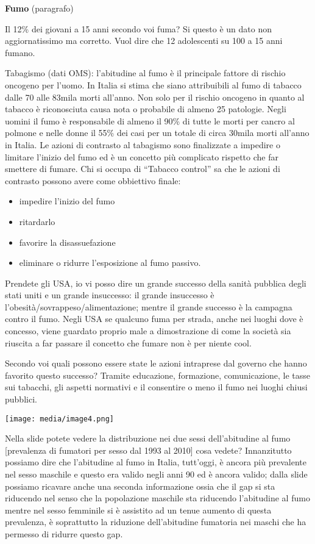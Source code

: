\documentclass[]{article}
\begin{document}
\textbf{Fumo} (paragrafo)

Il 12\% dei giovani a 15 anni secondo voi fuma? Si questo è un dato non
aggiornatissimo ma corretto. Vuol dire che 12 adolescenti su 100 a 15
anni fumano.

Tabagismo (dati OMS): l'abitudine al fumo è il principale fattore di
rischio oncogeno per l'uomo. In Italia si stima che siano attribuibili
al fumo di tabacco dalle 70 alle 83mila morti all'anno. Non solo per il
rischio oncogeno in quanto al tabacco è riconosciuta causa nota o
probabile di almeno 25 patologie. Negli uomini il fumo è responsabile di
almeno il 90\% di tutte le morti per cancro al polmone e nelle donne il
55\% dei casi per un totale di circa 30mila morti all'anno in Italia. Le
azioni di contrasto al tabagismo sono finalizzate a impedire o limitare
l'inizio del fumo ed è un concetto più complicato rispetto che far
smettere di fumare. Chi si occupa di ``Tabacco control'' sa che le
azioni di contrasto possono avere come obbiettivo finale:

\begin{itemize}
\item
  impedire l'inizio del fumo
\item
  ritardarlo
\item
  favorire la disassuefazione
\item
  eliminare o ridurre l'esposizione al fumo passivo.
\end{itemize}

Prendete gli USA, io vi posso dire un grande successo della sanità
pubblica degli stati uniti e un grande insuccesso: il grande insuccesso
è l'obesità/sovrappeso/alimentazione; mentre il grande successo è la
campagna contro il fumo. Negli USA se qualcuno fuma per strada, anche
nei luoghi dove è concesso, viene guardato proprio male a dimostrazione
di come la società sia riuscita a far passare il concetto che fumare non
è per niente cool.

Secondo voi quali possono essere state le azioni intraprese dal governo
che hanno favorito questo successo? Tramite educazione, formazione,
comunicazione, le tasse sui tabacchi, gli aspetti normativi e il
consentire o meno il fumo nei luoghi chiusi pubblici.

\texttt{[image: media/image4.png]}

Nella slide potete vedere la distribuzione nei due sessi dell'abitudine
al fumo {[}prevalenza di fumatori per sesso dal 1993 al 2010{]} cosa
vedete? Innanzitutto possiamo dire che l'abitudine al fumo in Italia,
tutt'oggi, è ancora più prevalente nel sesso maschile e questo era
valido negli anni 90 ed è ancora valido; dalla slide possiamo ricavare
anche una seconda informazione ossia che il gap si sta riducendo nel
senso che la popolazione maschile sta riducendo l'abitudine al fumo
mentre nel sesso femminile si è assistito ad un tenue aumento di questa
prevalenza, è soprattutto la riduzione dell'abitudine fumatoria nei
maschi che ha permesso di ridurre questo gap.
\end{document}
